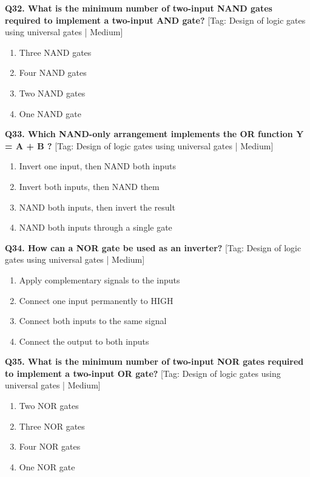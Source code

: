 \noindent\textbf{Q32. What is the minimum number of two-input NAND gates required to implement a two-input AND gate?} \hfill [Tag: Design of logic gates using universal gates | Medium]
\begin{enumerate}[label=(\alph*),topsep=2pt,itemsep=1pt,partopsep=0pt,parsep=0pt]
    \item {Three NAND gates}
    \item {Four NAND gates}
    \item {Two NAND gates}
    \item {One NAND gate}
\end{enumerate}
\vspace{2mm}

\noindent\textbf{Q33. Which NAND-only arrangement implements the OR function Y = A + B ?} \hfill [Tag: Design of logic gates using universal gates | Medium]
\begin{enumerate}[label=(\alph*),topsep=2pt,itemsep=1pt,partopsep=0pt,parsep=0pt]
    \item {Invert one input, then NAND both inputs}
    \item {Invert both inputs, then NAND them}
    \item {NAND both inputs, then invert the result}
    \item {NAND both inputs through a single gate}
\end{enumerate}
\vspace{2mm}

\noindent\textbf{Q34. How can a NOR gate be used as an inverter?} \hfill [Tag: Design of logic gates using universal gates | Medium]
\begin{enumerate}[label=(\alph*),topsep=2pt,itemsep=1pt,partopsep=0pt,parsep=0pt]
    \item {Apply complementary signals to the inputs}
    \item {Connect one input permanently to HIGH}
    \item {Connect both inputs to the same signal}
    \item {Connect the output to both inputs}
\end{enumerate}
\vspace{2mm}

\noindent\textbf{Q35. What is the minimum number of two-input NOR gates required to implement a two-input OR gate?} \hfill [Tag: Design of logic gates using universal gates | Medium]
\begin{enumerate}[label=(\alph*),topsep=2pt,itemsep=1pt,partopsep=0pt,parsep=0pt]
    \item {Two NOR gates}
    \item {Three NOR gates}
    \item {Four NOR gates}
    \item {One NOR gate}
\end{enumerate}
\vspace{2mm}

